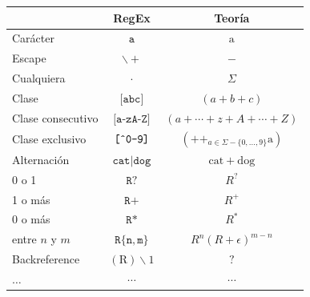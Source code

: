 \begin{table}[H]
    \centering
    \begin{tabular}{lcc}
                          & RegEx                                     & Teoría                                                       \\
        \hline
        Carácter          & $\texttt{a}$                              & $\mathrm{a}$                                                 \\
        Escape            & $\backslash+$                             & $-$                                                          \\
        Cualquiera        & $\cdot$                                   & $\Sigma$                                                     \\
        Clase             & {$\texttt{[abc]}$}                        & $(a+b+c)$                                                    \\
        Clase consecutivo & {$\texttt{[a-zA-Z]}$}                     & $(a+\cdots+z+A+\cdots+Z)$                                    \\
        Clase exclusivo   & {$\texttt{[} \texttt{\^{}}\texttt{0-9]}$} & $\left(++_{a \in \Sigma-\{0, \ldots, 9\}} \mathrm{a}\right)$ \\
        Alternación       & $\texttt{cat} \mid \texttt{dog}$          & $\mathrm{cat}+\mathrm{dog}$                                  \\
        0 o 1             & $\texttt{R} ?$                            & $R^?$                                                        \\
        1 o más           & $\texttt{R}+$                             & $R^{+}$                                                      \\
        0 o más           & $\texttt{R} *$                            & $R^*$                                                        \\
        entre $n$ y $m$   & $\texttt{R}\{\texttt{n}, \texttt{m}\}$    & $R^n(R+\epsilon)^{m-n}$                                      \\
        Backreference     & $(\mathrm{R}) \backslash 1$               & $?$                                                          \\
        $\ldots$          & $\cdots$                                  & $\cdots$
    \end{tabular}
\end{table}

